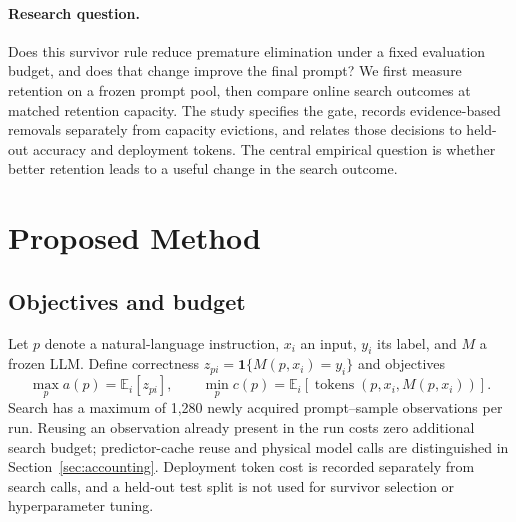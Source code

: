 \documentclass{article}
\begin{document}
\paragraph{Research question.}
Does this survivor rule reduce premature elimination under a fixed evaluation
budget, and does that change improve the final prompt? We first measure retention
on a frozen prompt pool, then compare online search outcomes at matched retention
capacity. The study specifies the gate, records evidence-based removals separately
from capacity evictions, and relates those decisions to held-out accuracy and
deployment tokens. The central empirical question is whether better retention
leads to a useful change in the search outcome.





\section{Proposed Method}
\subsection{Objectives and budget}
Let $p$ denote a natural-language instruction, $x_i$ an input, $y_i$ its label, and $M$ a frozen LLM. Define correctness $z_{pi}=\mathbf{1}\{M(p,x_i)=y_i\}$ and objectives
\begin{equation}
\max_p a(p)=\mathbb{E}_i[z_{pi}],\qquad \min_p c(p)=\mathbb{E}_i[\operatorname{tokens}(p,x_i,M(p,x_i))].
\end{equation}
Search has a maximum of 1,280 newly acquired prompt--sample observations per run. Reusing an observation already present in the run costs zero additional search budget; predictor-cache reuse and physical model calls are distinguished in Section~\ref{sec:accounting}. Deployment token cost is recorded separately from search calls, and a held-out test split is not used for survivor selection or hyperparameter tuning.
\end{document}
